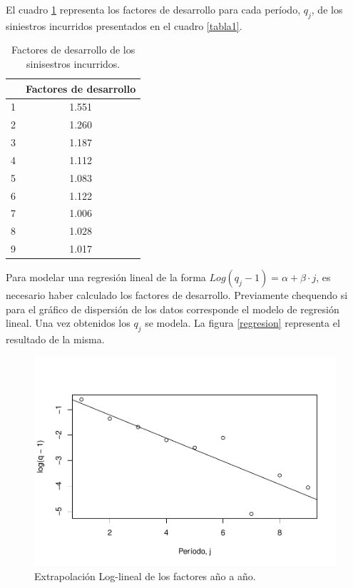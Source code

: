 \documentclass[
  12pt,
]{article}
\begin{document}
El cuadro \ref{factores1} representa los factores de desarrollo para
cada período, \(q_j\), de los siniestros incurridos presentados en el
cuadro \ref{tabla1}.

\begin{table}[ht]
\centering
\caption{Factores de desarrollo de los sinisestros incurridos.} 
\label{factores1}
\begin{tabular}{cc}
  \hline
 & Factores de desarrollo \\ 
  \hline
1 & 1.551 \\ 
  2 & 1.260 \\ 
  3 & 1.187 \\ 
  4 & 1.112 \\ 
  5 & 1.083 \\ 
  6 & 1.122 \\ 
  7 & 1.006 \\ 
  8 & 1.028 \\ 
  9 & 1.017 \\ 
   \hline
\end{tabular}
\end{table}

Para modelar una regresión lineal de la forma
\(Log(q_j -1) = \alpha + \beta\cdot j\), es necesario haber calculado
los factores de desarrollo. Previamente chequendo si para el gráfico de
dispersión de los datos corresponde el modelo de regresión lineal. Una
vez obtenidos los \(q_j\) se modela. La figura \ref{regresion}
representa el resultado de la misma.

\begin{figure}[H]
\includegraphics[width=1\linewidth]{informe_files/figure-latex/unnamed-chunk-9-1} \caption{\label{regresion} Extrapolación Log-lineal de los factores año a año.}\label{fig:unnamed-chunk-9}
\end{figure}
\end{document}
